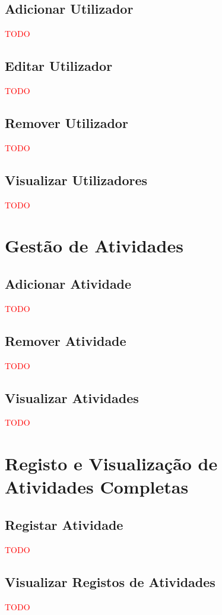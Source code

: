 \documentclass[a4paper,12pt]{scrreprt}
\begin{document}
    \subsection{Adicionar Utilizador}
    \textcolor{red}{TODO}
    \subsection{Editar Utilizador}
    \textcolor{red}{TODO}
    \subsection{Remover Utilizador}
    \textcolor{red}{TODO}
    \subsection{Visualizar Utilizadores}
    \textcolor{red}{TODO}

\section{Gestão de Atividades}
    \label{sec:gestao-atividades}
    \subsection{Adicionar Atividade}
    \textcolor{red}{TODO}
    \subsection{Remover Atividade}
    \textcolor{red}{TODO}
    \subsection{Visualizar Atividades}
    \textcolor{red}{TODO}

\section{Registo e Visualização de Atividades Completas}
    \label{sec:registo-atividades}
    \subsection{Registar Atividade}
    \textcolor{red}{TODO}
    \subsection{Visualizar Registos de Atividades}
    \textcolor{red}{TODO}
\end{document}
